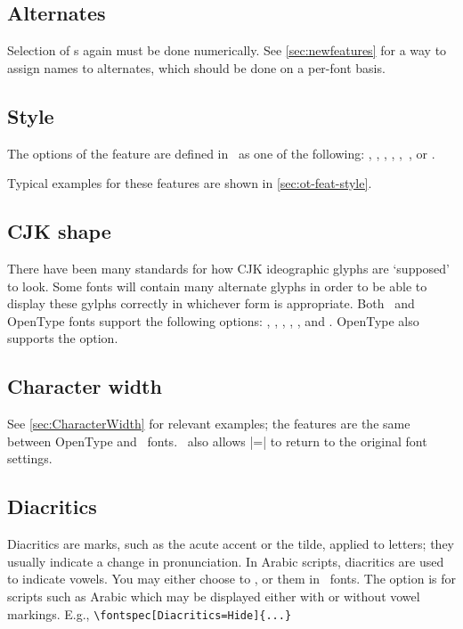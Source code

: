 \documentclass[a4paper]{l3doc}
\begin{document}
\subsection{Alternates}
Selection of s again must be done numerically.
See \vref{sec:newfeatures} for a way to assign names to alternates,
which should be done on a per-font basis.


\subsection{Style}
The options of the  feature
are defined in \AAT\ as one of the following: ,
, , ,
,\footnotemark\ , or .

Typical examples for these features are shown in \ref{sec:ot-feat-style}.

\subsection{CJK shape}
There have been many standards for how CJK ideographic
glyphs are `supposed' to look. Some fonts will contain many alternate
glyphs in order to be able to display these gylphs
correctly in whichever form is appropriate. Both \AAT\ and OpenType
fonts support the following  options:
, , , ,
, and . OpenType also supports the  option.

\subsection{Character width}
See \vref{sec:CharacterWidth} for relevant examples; the features are
the same between OpenType and \AAT\ fonts.
\AAT\ also allows |=| to return to
the original font settings.

\subsection{Diacritics}
Diacritics are marks, such as the acute accent or the tilde, applied to letters; they usually indicate a change in pronunciation.
In Arabic scripts, diacritics are used to indicate vowels.
You may either choose
to ,  or  them in \AAT\ fonts.
The  option is for scripts such as Arabic which may be
displayed either with or without vowel markings. E.g.,
\verb|\fontspec[Diacritics=Hide]{...}|
\end{document}
